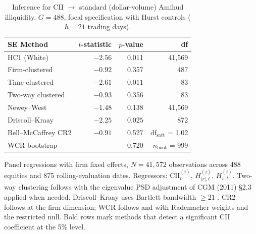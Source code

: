 \documentclass[preprint,12pt,authoryear]{elsarticle}
\begin{document}
\begin{table}[H]
\centering
\begin{threeparttable}
\caption{Inference for CII $\to$ standard (dollar-volume) Amihud illiquidity, $G = 488$, focal specification with Hurst controls ($h = 21$ trading days).}
\label{tab:predictive}
\begin{tabular}{lrrr}
\toprule
SE Method & $t$-statistic & $p$-value & df \\
\midrule
HC1 (White) & $-2.56$ & 0.011 & 41{,}569 \\
Firm-clustered & $-0.92$ & 0.357 & 487 \\
Time-clustered & $\mathbf{-2.61}$ & $\mathbf{0.011}$ & 83 \\
Two-way clustered & $-0.93$ & 0.356 & 83 \\
Newey--West & $-1.48$ & 0.138 & 41{,}569 \\
Driscoll--Kraay & $\mathbf{-2.25}$ & $\mathbf{0.025}$ & 872 \\
Bell--McCaffrey CR2 & $-0.91$ & 0.527 & df$_\mathrm{satt}$ = 1.02 \\
WCR bootstrap & --- & 0.720 & $n_\mathrm{boot}$ = 999 \\
\bottomrule
\end{tabular}
\begin{tablenotes}
\small
\item Panel regressions with firm fixed effects, $N = 41{,}572$ observations across 488 equities and 875 rolling-evaluation dates. Regressors: $\mathrm{CII}^{(i)}_{t}$, $H^{(i)}_{|r|,t}$, $H^{(i)}_{v,t}$. Two-way clustering follows \citet{cameron2011robust} with the eigenvalue PSD adjustment of CGM (2011) \S2.3 applied when needed. Driscoll--Kraay uses Bartlett bandwidth $\geq 21$ \citep{driscoll1998consistent}. CR2 follows \citet{imbens2016robust} at the firm dimension; WCR follows \citet{cameron2008bootstrap} and \citet{mackinnon2017wild} with Rademacher weights and the restricted null. Bold rows mark methods that detect a significant CII coefficient at the 5\% level.
\end{tablenotes}
\end{threeparttable}
\end{table}
\end{document}
